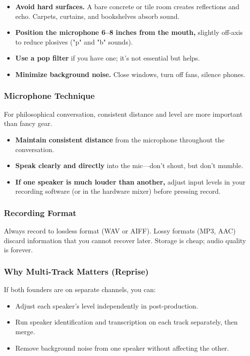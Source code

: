 \documentclass[11pt,letterpaper]{article}
\begin{document}
\begin{itemize}
  \item \textbf{Avoid hard surfaces.} A bare concrete or tile room creates reflections and echo. Carpets, curtains, and bookshelves absorb sound.
  \item \textbf{Position the microphone 6–8 inches from the mouth,} slightly off-axis to reduce plosives ("p" and "b" sounds).
  \item \textbf{Use a pop filter} if you have one; it's not essential but helps.
  \item \textbf{Minimize background noise.} Close windows, turn off fans, silence phones.
\end{itemize}

\subsubsection{Microphone Technique}

For philosophical conversation, consistent distance and level are more important than fancy gear.

\begin{itemize}
  \item \textbf{Maintain consistent distance} from the microphone throughout the conversation.
  \item \textbf{Speak clearly and directly} into the mic—don't shout, but don't mumble.
  \item \textbf{If one speaker is much louder than another,} adjust input levels in your recording software (or in the hardware mixer) before pressing record.
\end{itemize}

\subsubsection{Recording Format}

Always record to lossless format (WAV or AIFF). Lossy formats (MP3, AAC) discard information that you cannot recover later. Storage is cheap; audio quality is forever.

\subsubsection{Why Multi-Track Matters (Reprise)}

If both founders are on separate channels, you can:
\begin{itemize}
  \item Adjust each speaker's level independently in post-production.
  \item Run speaker identification and transcription on each track separately, then merge.
  \item Remove background noise from one speaker without affecting the other.
\end{itemize}
\end{document}
